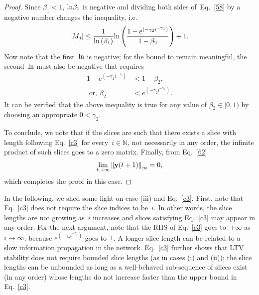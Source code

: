 \documentclass[draftclsnofoot, onecolumn, 12pt]{IEEEtran}
\def\ln{{\rm ln}}
\def\mbb{\mathbb}
\def\ra{\rightarrow}
\begin{document}
\begin{proof}
Since $\beta_1< 1$, $\ln\beta_1$ is negative and dividing both sides of~Eq.~\eqref{58} by a negative number changes the inequality, i.e.
\begin{eqnarray}\label{c3}
\vert M_j \vert \leq \frac{1}{\ln\left({\beta_1}\right)}\ln\left(\frac{1 - e^{(-\gamma_2i^{-\gamma_1})}}{1-\beta_2}\right)+1. 
\end{eqnarray}
Now note that the first~$\ln$ is negative; for the bound to remain meaningful, the second~$\ln$ must also be negative that requires 
\begin{align*}
1 - e^{(-\gamma_2i^{-\gamma_1})} &< 1-\beta_2,\\ \mbox{ or, } \beta_2 &< e^{(-\gamma_2i^{-\gamma_1})}.
\end{align*}
It can be verified that the above inequality is true for any value of $\beta_2\in[0,1)$ by choosing an appropriate $0<\gamma_2$. 

To conclude, we note that if the slices are such that there exists a slice with length following Eq.~\eqref{c3} for every~$i\in\mbb{N}$, not necessarily in any order, the infinite product of such slices goes to a zero matrix. Finally, from Eq.~\eqref{62}
\begin{eqnarray}
\lim_{t \rightarrow \infty}{\Vert {\bf{y}}(t+1)\Vert}_{\infty}=0,
\end{eqnarray}
which completes the proof in this case.
\end{proof}

In the following, we shed some light on case (iii) and Eq.~\eqref{c3}. First, note that Eq.~\eqref{c3} does not require the slice indices to be~$i$. In other words, the slice lengths are not growing as~$i$ increases and slices satisfying Eq.~\eqref{c3} may appear in any order. For the next argument, note that the RHS of Eq.~\eqref{c3} goes to~$+\infty$ as $i\ra\infty$; because $e^{(-\gamma_2 i^{-\gamma_1})}$ goes to~$1$. A longer slice length can be related to a slow information propagation in the network. Eq.~\eqref{c3} further shows that LTV stability does not require bounded slice lengths (as in cases (i) and (ii)); the slice lengths can be unbounded as long as a well-behaved sub-sequence of slices exist (in any order) whose lengths do not increase faster than the upper bound in Eq.~\eqref{c3}. 
\end{document}
